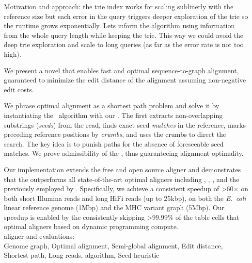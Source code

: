 %
Motivation and approach: the trie index works for scaling sublinerly with the
reference size but each error in the query triggers deeper exploration of the
trie so the runtime grows exponentially. Lets inform the \A algorithm using
information from the whole query length while keeping the trie. This way we
could avoid the deep trie exploration and scale to long queries (as far as the
error rate is not too high).

We present a novel \A \textit{\seedh} that enables fast and optimal
sequence-to-graph alignment, guaranteed to minimize the edit distance of the
alignment assuming non-negative edit costs.

We phrase optimal alignment as a shortest path problem and solve it by
instantiating the \A~algorithm with our \seedh. The \seedh first extracts
non-overlapping substrings (\textit{seeds}) from the read, finds exact seed
\textit{matches} in the reference, marks preceding reference positions by
\textit{crumbs}, and uses the crumbs to direct the \A search. The key idea is to
punish paths for the absence of foreseeable seed matches. We prove admissibility
of the \seedh, thus guaranteeing alignment optimality.

\qquad Our implementation extends the free and open source aligner and
demonstrates that the \seedh outperforms all state-of-the-art optimal aligners
including \graphaligner, \vargas, \pasgal, and the \prefixh previously employed
by \astarix. Specifically, we achieve a consistent speedup of >60$\times$ on
both short Illumina reads and long HiFi reads (up to 25kbp), on both the
\textit{E.~coli} linear reference genome (1Mbp) and the MHC variant graph
(5Mbp). Our speedup is enabled by the \seedh consistently skipping >99.99\% of
the table cells that optimal aligners based on dynamic programming
compute.\\

\astarix aligner and evaluations: \astarixurl\\

Genome graph, Optimal alignment, Semi-global alignment, Edit distance, Shortest
path, Long reads, \A algorithm, Seed heuristic
